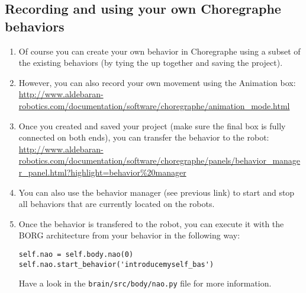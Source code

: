 \documentclass[a4paper, 10pt]{article}
\begin{document}
\subsection{Recording and using your own Choregraphe behaviors}

\begin{enumerate}
    \item Of course you can create your own behavior in Choregraphe using a subset of the existing behaviors (by tying the up together and saving the project). 
    \item However, you can also record your own movement using the Animation box: \\
        \url{http://www.aldebaran-robotics.com/documentation/software/choregraphe/animation_mode.html} \\
    \item Once you created and saved your project (make sure the final box is fully connected on both ends), you can transfer the behavior to the robot: \\ 
        \url{http://www.aldebaran-robotics.com/documentation/software/choregraphe/panels/behavior_manager_panel.html?highlight=behavior%20manager}
    \item You can also use the behavior manager (see previous link) to start and stop all behaviors that are currently located on the robots.
    \item Once the behavior is transfered to the robot, you can execute it with the BORG architecture from your behavior in the following way:
\begin{lstlisting}
self.nao = self.body.nao(0)
self.nao.start_behavior('introducemyself_bas')
\end{lstlisting}
        Have a look in the \lstinline{brain/src/body/nao.py} file for more information.
\end{enumerate}
\end{document}

